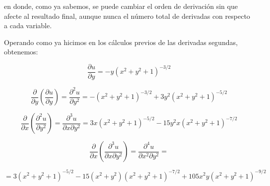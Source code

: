 \documentclass[
  a4paper,
]{scrreport}
\theoremstyle{definition}
\theoremstyle{remark}
\begin{document}
\begin{tcolorbox}
en donde, como ya sabemos, se puede cambiar el orden de derivación sin
que afecte al resultado final, aunque nunca el número total de derivadas
con respecto a cada variable.

Operando como ya hicimos en los cálculos previos de las derivadas
segundas, obtenemos:

\[
\frac{{\partial u}}{{\partial y}} =  - y\left( {x^2  + y^2  + 1}
\right)^{ - 3/2}
\]

\[
\frac{\partial }{{\partial y}}\left( {\frac{{\partial u}}{{\partial
y}}} \right) = \frac{{\partial ^2 u}}{{\partial y^2 }} =  - \left(
{x^2  + y^2  + 1} \right)^{ - 3/2}  + 3y^2 \left( {x^2  + y^2  + 1}
\right)^{ - 5/2}
\]

\[
\frac{\partial }{{\partial x}}\left( {\frac{{\partial ^2
u}}{{\partial y^2 }}} \right) = \frac{{\partial ^3 u}}{{\partial
x\partial y^2 }} = 3x\left( {x^2  + y^2  + 1} \right)^{ - 5/2}  -
15y^2 x\left( {x^2  + y^2  + 1} \right)^{ - 7/2}
\]

\[
\frac{\partial }{{\partial x}}\left( {\frac{{\partial ^3
u}}{{\partial x\partial y^2 }}} \right) = \frac{{\partial ^4
u}}{{\partial x^2 \partial y^2 }} =
\]

\[
=3\left( {x^2  + y^2  + 1} \right)^{ - 5/2}  - 15\left( {x^2  + y^2
} \right)\left( {x^2  + y^2 + 1} \right)^{ - 7/2}  + 105x^2 y\left(
{x^2  + y^2  + 1} \right)^{ - 9/2}
\]

\end{tcolorbox}
\end{document}
